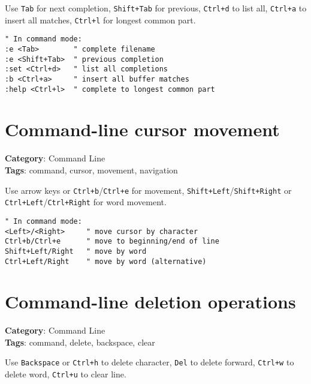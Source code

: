 {{{{Use {\footnotesize \Verb§Tab§} for next completion, {\footnotesize \Verb§Shift+Tab§} for previous, {\footnotesize \Verb§Ctrl+d§} to list all, {\footnotesize \Verb§Ctrl+a§} to insert all matches, {\footnotesize \Verb§Ctrl+l§} for longest common part.

\begin{Exa*}{}
\begin{Verbatim}[fontsize=\footnotesize, breaklines, breakanywhere]
" In command mode:
:e <Tab>        " complete filename
:e <Shift+Tab>  " previous completion
:set <Ctrl+d>   " list all completions
:b <Ctrl+a>     " insert all buffer matches
:help <Ctrl+l>  " complete to longest common part
\end{Verbatim}
\end{Exa*}

\section{Command-line cursor movement}

\textbf{Category}: Command Line\\ \textbf{Tags}: command, cursor, movement, navigation
\vspace{0.5cm}

Use arrow keys or {\footnotesize \Verb§Ctrl+b§}/{\footnotesize \Verb§Ctrl+e§} for movement, {\footnotesize \Verb§Shift+Left§}/{\footnotesize \Verb§Shift+Right§} or {\footnotesize \Verb§Ctrl+Left§}/{\footnotesize \Verb§Ctrl+Right§} for word movement.

\begin{Exa*}{}
\begin{Verbatim}[fontsize=\footnotesize, breaklines, breakanywhere]
" In command mode:
<Left>/<Right>     " move cursor by character
Ctrl+b/Ctrl+e      " move to beginning/end of line
Shift+Left/Right   " move by word
Ctrl+Left/Right    " move by word (alternative)
\end{Verbatim}
\end{Exa*}

\section{Command-line deletion operations}

\textbf{Category}: Command Line\\ \textbf{Tags}: command, delete, backspace, clear
\vspace{0.5cm}

Use {\footnotesize \Verb§Backspace§} or {\footnotesize \Verb§Ctrl+h§} to delete character, {\footnotesize \Verb§Del§} to delete forward, {\footnotesize \Verb§Ctrl+w§} to delete word, {\footnotesize \Verb§Ctrl+u§} to clear line.

}}}}
